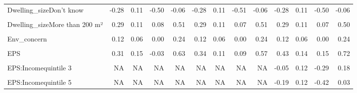 \begin{table}
\begin{tabular}[t]{lrrrrrrrrrrrr}
Dwelling\_sizeDon't know & -0.28 & 0.11 & -0.50 & -0.06 & -0.28 & 0.11 & -0.51 & -0.06 & -0.28 & 0.11 & -0.50 & -0.06\\
\cellcolor{gray!10}{Dwelling\_sizeLess than 25 m²} & \cellcolor{gray!10}{-0.41} & \cellcolor{gray!10}{0.27} & \cellcolor{gray!10}{-1.00} & \cellcolor{gray!10}{0.13} & \cellcolor{gray!10}{-0.43} & \cellcolor{gray!10}{0.27} & \cellcolor{gray!10}{-0.98} & \cellcolor{gray!10}{0.11} & \cellcolor{gray!10}{-0.43} & \cellcolor{gray!10}{0.28} & \cellcolor{gray!10}{-1.01} & \cellcolor{gray!10}{0.10}\\
Dwelling\_sizeMore than 200 m² & 0.29 & 0.11 & 0.08 & 0.51 & 0.29 & 0.11 & 0.07 & 0.51 & 0.29 & 0.11 & 0.07 & 0.50\\
\cellcolor{gray!10}{Rural} & \cellcolor{gray!10}{0.09} & \cellcolor{gray!10}{0.07} & \cellcolor{gray!10}{-0.04} & \cellcolor{gray!10}{0.22} & \cellcolor{gray!10}{0.09} & \cellcolor{gray!10}{0.07} & \cellcolor{gray!10}{-0.04} & \cellcolor{gray!10}{0.22} & \cellcolor{gray!10}{0.09} & \cellcolor{gray!10}{0.07} & \cellcolor{gray!10}{-0.04} & \cellcolor{gray!10}{0.22}\\
Env\_concern & 0.12 & 0.06 & 0.00 & 0.24 & 0.12 & 0.06 & 0.00 & 0.24 & 0.12 & 0.06 & 0.00 & 0.24\\
\cellcolor{gray!10}{Gov\_support} & \cellcolor{gray!10}{10.63} & \cellcolor{gray!10}{2.58} & \cellcolor{gray!10}{7.34} & \cellcolor{gray!10}{18.58} & \cellcolor{gray!10}{10.76} & \cellcolor{gray!10}{2.77} & \cellcolor{gray!10}{7.26} & \cellcolor{gray!10}{19.30} & \cellcolor{gray!10}{10.64} & \cellcolor{gray!10}{2.64} & \cellcolor{gray!10}{7.30} & \cellcolor{gray!10}{18.04}\\
EPS & 0.31 & 0.15 & -0.03 & 0.63 & 0.34 & 0.11 & 0.09 & 0.57 & 0.43 & 0.14 & 0.15 & 0.72\\
\cellcolor{gray!10}{EPS:Incomequintile 2} & \cellcolor{gray!10}{NA} & \cellcolor{gray!10}{NA} & \cellcolor{gray!10}{NA} & \cellcolor{gray!10}{NA} & \cellcolor{gray!10}{NA} & \cellcolor{gray!10}{NA} & \cellcolor{gray!10}{NA} & \cellcolor{gray!10}{NA} & \cellcolor{gray!10}{-0.11} & \cellcolor{gray!10}{0.13} & \cellcolor{gray!10}{-0.36} & \cellcolor{gray!10}{0.13}\\
EPS:Incomequintile 3 & NA & NA & NA & NA & NA & NA & NA & NA & -0.05 & 0.12 & -0.29 & 0.18\\
\cellcolor{gray!10}{EPS:Incomequintile 4} & \cellcolor{gray!10}{NA} & \cellcolor{gray!10}{NA} & \cellcolor{gray!10}{NA} & \cellcolor{gray!10}{NA} & \cellcolor{gray!10}{NA} & \cellcolor{gray!10}{NA} & \cellcolor{gray!10}{NA} & \cellcolor{gray!10}{NA} & \cellcolor{gray!10}{-0.05} & \cellcolor{gray!10}{0.12} & \cellcolor{gray!10}{-0.28} & \cellcolor{gray!10}{0.18}\\
EPS:Incomequintile 5 & NA & NA & NA & NA & NA & NA & NA & NA & -0.19 & 0.12 & -0.42 & 0.03\\
\bottomrule
\end{tabular}
\end{table}
